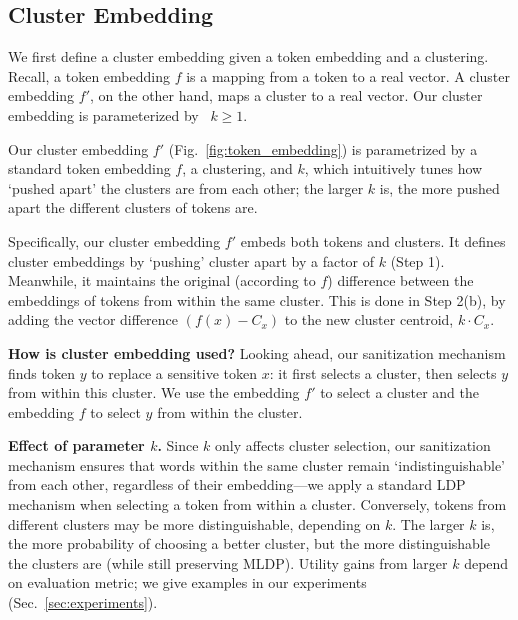 \subsection{Cluster Embedding}\label{sec:token_embedding}

We first define a cluster embedding given a token embedding and a clustering. Recall, a token embedding $f$ is a mapping from a token to a real vector. A cluster embedding $f'$, on the other hand, maps a cluster to a real vector. Our cluster embedding is parameterized by ~\( k \geq 1 \).


Our cluster embedding $f'$ (Fig.~\ref{fig:token_embedding}) is parametrized by a standard token embedding $f$, a clustering, and \( k \), which intuitively tunes how `pushed apart' the clusters are from each other; the larger \( k \) is, the more pushed apart the different clusters of tokens are. 

Specifically, our cluster embedding  %
 \( f' \) embeds  both tokens and clusters. It defines cluster embeddings by `pushing' cluster apart by a factor of \( k \) (Step 1). Meanwhile, it maintains the original (according to $f$) difference between the embeddings of tokens from within the same cluster. This is done in Step 2(b), by adding the vector difference \( (f(x) - C_x) \) to the new cluster centroid, \( k\cdot C_x \). %

\noindent
\textbf{How is cluster embedding used? } %
Looking ahead, our sanitization mechanism finds token \( y \) to replace a sensitive token \( x \): it first selects a cluster, then  selects \( y \) from within this cluster. We use the embedding \( f' \) to select a cluster and the embedding \( f \) to select \( y \) from within the cluster. 

\noindent
\textbf{Effect of parameter $k$. }
Since $k$ only affects cluster selection, our sanitization mechanism ensures that words within the same cluster  remain  `indistinguishable' from each other, regardless of their embedding---we apply a standard LDP mechanism when selecting a token from within a cluster. 
Conversely, tokens from different clusters may be more distinguishable, 
depending on \( k \). %
The larger $k$ is, the more probability of choosing a better cluster, but the more distinguishable the clusters are (while still preserving MLDP). Utility gains from larger $k$  depend on evaluation metric; we give examples in our experiments (Sec.~\ref{sec:experiments}). %

